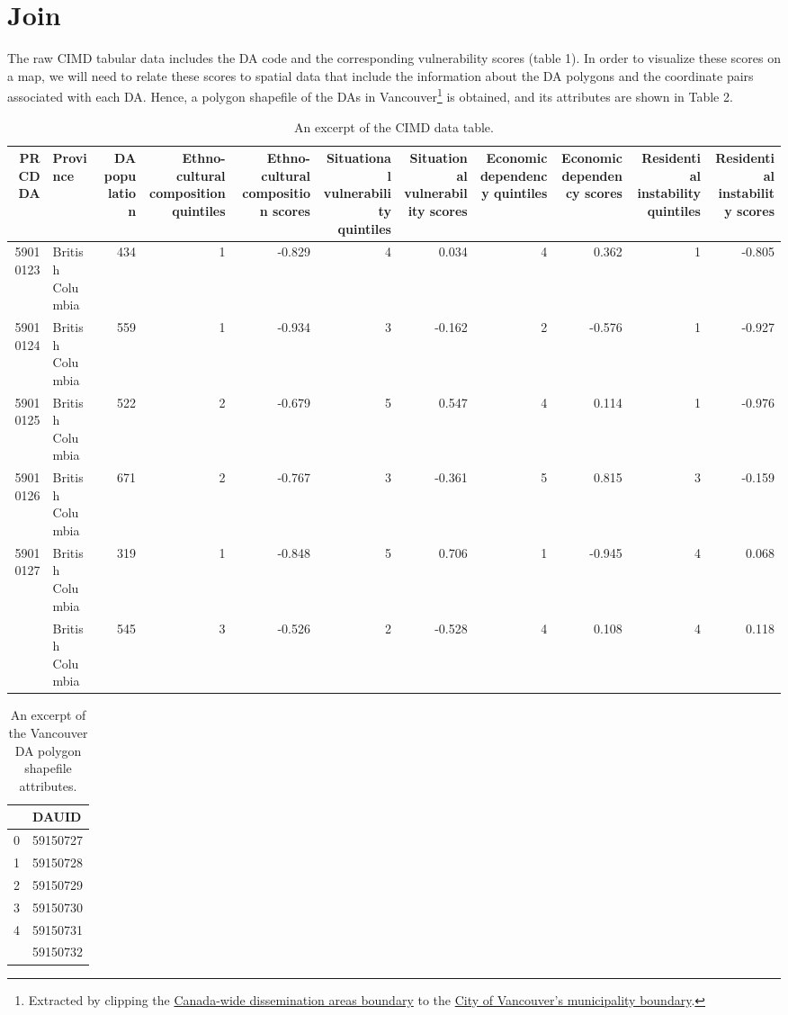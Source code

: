 \documentclass[
]{book}
\begin{document}
\hypertarget{join}{%
\section{Join}\label{join}}

The raw CIMD tabular data includes the DA code and the corresponding vulnerability scores (table 1). In order to visualize these scores on a map, we will need to relate these scores to spatial data that include the information about the DA polygons and the coordinate pairs associated with each DA. Hence, a polygon shapefile of the DAs in Vancouver\footnote{Extracted by clipping the \href{https://www12.statcan.gc.ca/census-recensement/2011/geo/bound-limit/bound-limit-2016-eng.cfm}{Canada-wide dissemination areas boundary} to the \href{https://opendata.vancouver.ca/explore/dataset/city-boundary}{City of Vancouver's municipality boundary}.} is obtained, and its attributes are shown in Table 2.

\begin{table}

\caption{\label{tab:5-case-join}An excerpt of the CIMD data table.}
\centering
\begin{tabular}[t]{rlrrrrrrrrr}
\toprule
PRCDDA & Province & DA population & Ethno-cultural composition quintiles & Ethno-cultural composition scores & Situational vulnerability quintiles & Situational vulnerability scores & Economic dependency quintiles & Economic dependency scores & Residential instability quintiles & Residential instability scores\\
\midrule
59010123 & British Columbia & 434 & 1 & -0.829 & 4 & 0.034 & 4 & 0.362 & 1 & -0.805\\
59010124 & British Columbia & 559 & 1 & -0.934 & 3 & -0.162 & 2 & -0.576 & 1 & -0.927\\
59010125 & British Columbia & 522 & 2 & -0.679 & 5 & 0.547 & 4 & 0.114 & 1 & -0.976\\
59010126 & British Columbia & 671 & 2 & -0.767 & 3 & -0.361 & 5 & 0.815 & 3 & -0.159\\
59010127 & British Columbia & 319 & 1 & -0.848 & 5 & 0.706 & 1 & -0.945 & 4 & 0.068\\
\addlinespace
59010128 & British Columbia & 545 & 3 & -0.526 & 2 & -0.528 & 4 & 0.108 & 4 & 0.118\\
\bottomrule
\end{tabular}
\end{table}

\begin{table}

\caption{\label{tab:5-case-study-3}An excerpt of the Vancouver DA polygon shapefile attributes.}
\centering
\begin{tabular}[t]{ll}
\toprule
  & DAUID\\
\midrule
0 & 59150727\\
1 & 59150728\\
2 & 59150729\\
3 & 59150730\\
4 & 59150731\\
\addlinespace
5 & 59150732\\
\bottomrule
\end{tabular}
\end{table}
\end{document}
